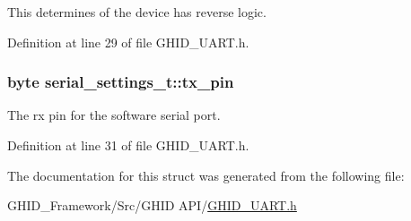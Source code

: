 \-This determines of the device has reverse logic. 



\-Definition at line 29 of file \-G\-H\-I\-D\-\_\-\-U\-A\-R\-T.\-h.

\hypertarget{structserial__settings__t_a0f93cf06b293d16a9988f160ff6bd796}{
\subsubsection[{tx\-\_\-pin}]{\setlength{\rightskip}{0pt plus 5cm}byte {\bf serial\-\_\-settings\-\_\-t\-::tx\-\_\-pin}}}\label{structserial__settings__t_a0f93cf06b293d16a9988f160ff6bd796}


\-The rx pin for the software serial port. 



\-Definition at line 31 of file \-G\-H\-I\-D\-\_\-\-U\-A\-R\-T.\-h.



\-The documentation for this struct was generated from the following file\-:\begin{DoxyCompactItemize}
\item 
\-G\-H\-I\-D\-\_\-\-Framework/\-Src/\-G\-H\-I\-D A\-P\-I/\hyperlink{_g_h_i_d___u_a_r_t_8h}{\-G\-H\-I\-D\-\_\-\-U\-A\-R\-T.\-h}\end{DoxyCompactItemize}
